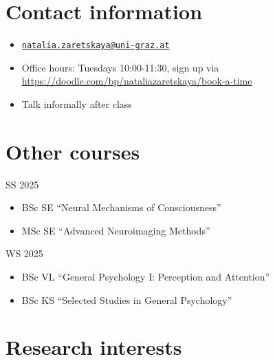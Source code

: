 \documentclass[
  letterpaper,
]{report}
\providecommand{\tightlist}{%
  \setlength{\itemsep}{0pt}\setlength{\parskip}{0pt}}\usepackage{longtable,booktabs,array}
\begin{document}
\section*{Contact information}\label{contact-information}


\begin{itemize}
\tightlist
\item
  \href{mailto:natalia.zaretskaya@uni-graz.at}{\nolinkurl{natalia.zaretskaya@uni-graz.at}}
\item
  Office hours: Tuesdays 10:00-11:30, sign up via
  \url{https://doodle.com/bp/nataliazaretskaya/book-a-time}
\item
  Talk informally after class
\end{itemize}

\section*{Other courses}\label{other-courses}


SS 2025

\begin{itemize}
\tightlist
\item
  BSc SE ``Neural Mechanisms of Consciousness''
\item
  MSc SE ``Advanced Neuroimaging Methods''
\end{itemize}

WS 2025

\begin{itemize}
\item
  BSc VL ``General Psychology I: Perception and Attention''
\item
  BSc KS ``Selected Studies in General Psychology''
\end{itemize}

\section*{Research interests}\label{research-interests}

\end{document}
